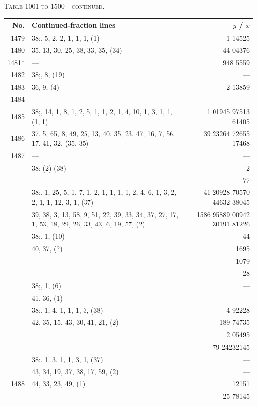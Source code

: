 \documentclass[11pt]{article}
\newcommand{\peheading}{%
  \begin{center}\small\textsc{Table 1001 to 1500---continued.}\end{center}
}
\begin{document}
\peheading
\renewcommand{\arraystretch}{1.15}
{\footnotesize
\begin{longtable}{|r|p{8.5cm}|r|}
\hline
\textbf{No.} & \textbf{Continued-fraction lines} & \textbf{$y$ \;/\; $x$}\\
\hline\endhead
1479   & $38$;\; 2, 5, 2, 2, 1, 1, 1, (1) & 1 14525 \\
1480   & 35, 13, 30, 25, 38, 33, 35, (34) & 44 04376 \\
1481*  & --- & 948 5559 \\
1482   & $38$;\; 2, 8, (19) & --- \\
1483   & 36, 9, (4) & 2 13859 \\
1484   & --- & --- \\
1485   & $38$;\; 2, 14, 1, 8, 1, 2, 5, 1, 1, 2, 1, 4, 10, 1, 3, 1, 1, (1, 1) & 1 01945 97513 61405 \\
1486   & 37, 5, 65, 8, 49, 25, 13, 40, 35, 23, 47, 16, 7, 56, 17, 41, 32, (35, 35) & 39 23264 72655 17468 \\
1487   & --- & --- \\
       & $38$;\; (2) (38) & 2 \\
       & & 77 \\
\hline
       & $38$;\; 1, 1, 25, 5, 1, 7, 1, 2, 1, 1, 1, 1, 2, 4, 6, 1, 3, 2, 2, 1, 1, 12, 3, 1, (37) & 41 20928 70570 44632 38045 \\
       & 39, 38, 3, 13, 58, 9, 51, 22, 39, 33, 34, 37, 27, 17, 1, 53, 18, 29, 26, 33, 43, 6, 19, 57, (2) & 1586 95889 00942 30191 81226 \\
\hline
       & $38$;\; 1, 1, (10) & 44 \\
       & 40, 37, (?) & 1695 \\
       & & 1079 \\
       & & 28 \\
       & $38$;\; 1, 1, (6) & --- \\
       & 41, 36, (1) & --- \\
       & $38$;\; 1, 1, 4, 1, 1, 1, 3, (38) & 4 92228 \\
       & 42, 35, 15, 43, 30, 41, 21, (2) & 189 74735 \\
       & & 2 05495 \\
       & & 79 24232145 \\
       & $38$;\; 1, 1, 3, 1, 1, 3, 1, (37) & --- \\
       & 43, 34, 19, 37, 38, 17, 59, (2) & --- \\
1488   & 44, 33, 23, 49, (1) & 12151 \\
       & & 25 78145 \\

\end{longtable}}
\end{document}
